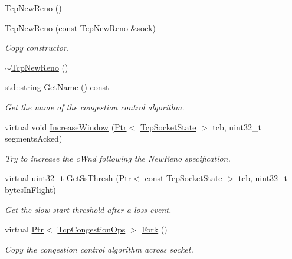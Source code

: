 \begin{DoxyCompactItemize}
\item 
\hyperlink{classns3_1_1TcpNewReno_a81686cb1590be6d7c754029fc8d7cf4e}{Tcp\+New\+Reno} ()
\item 
\hyperlink{classns3_1_1TcpNewReno_aed0c36a533ba7521440f91ca321aa771}{Tcp\+New\+Reno} (const \hyperlink{classns3_1_1TcpNewReno}{Tcp\+New\+Reno} \&sock)
\begin{DoxyCompactList}\small\item\em Copy constructor. \end{DoxyCompactList}\item 
\hyperlink{classns3_1_1TcpNewReno_abc9e89a0b1771a3507c3070f203f838b}{$\sim$\+Tcp\+New\+Reno} ()
\item 
std\+::string \hyperlink{classns3_1_1TcpNewReno_a0ecf92cb36c236c70e0ecaedfff6609e}{Get\+Name} () const 
\begin{DoxyCompactList}\small\item\em Get the name of the congestion control algorithm. \end{DoxyCompactList}\item 
virtual void \hyperlink{classns3_1_1TcpNewReno_a11db8ae90f4cebacc15524a793b0741a}{Increase\+Window} (\hyperlink{classns3_1_1Ptr}{Ptr}$<$ \hyperlink{classns3_1_1TcpSocketState}{Tcp\+Socket\+State} $>$ tcb, uint32\+\_\+t segments\+Acked)
\begin{DoxyCompactList}\small\item\em Try to increase the c\+Wnd following the New\+Reno specification. \end{DoxyCompactList}\item 
virtual uint32\+\_\+t \hyperlink{classns3_1_1TcpNewReno_a1cb467aaa4960dfe10b963ed9f3d5aa2}{Get\+Ss\+Thresh} (\hyperlink{classns3_1_1Ptr}{Ptr}$<$ const \hyperlink{classns3_1_1TcpSocketState}{Tcp\+Socket\+State} $>$ tcb, uint32\+\_\+t bytes\+In\+Flight)
\begin{DoxyCompactList}\small\item\em Get the slow start threshold after a loss event. \end{DoxyCompactList}\item 
virtual \hyperlink{classns3_1_1Ptr}{Ptr}$<$ \hyperlink{classns3_1_1TcpCongestionOps}{Tcp\+Congestion\+Ops} $>$ \hyperlink{classns3_1_1TcpNewReno_a2606d5fcd01a1eb4d5f4e6beb7a33192}{Fork} ()
\begin{DoxyCompactList}\small\item\em Copy the congestion control algorithm across socket. \end{DoxyCompactList}\end{DoxyCompactItemize}
